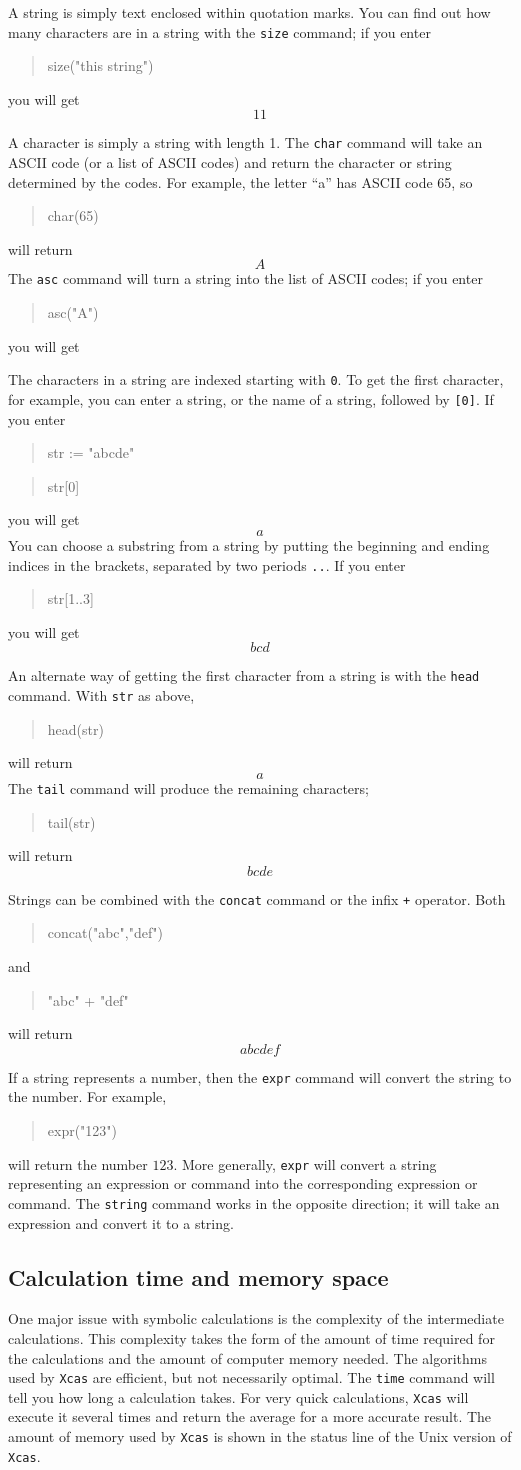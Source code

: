 \documentclass{article}
\newcommand{\xcasin}[1]
{\begin{quote}\ttfamily
#1
\end{quote}}
\newcommand{\xcasout}[1]
{\begin{equation*}
#1
\end{equation*}}
\begin{document}
A string is simply text enclosed within quotation marks.
You can find out how many characters are in a string with the
\texttt{size} command; if you enter
\xcasin{size("this string")}
you will get
\xcasout{11}

A character is simply a string with length 1.  
The \texttt{char}
command will take an ASCII code (or a list of ASCII codes) and return
the character or string determined by the codes.  For example, the
letter ``a'' has ASCII code 65, so
\xcasin{char(65)}
will return
\xcasout{A}
The \texttt{asc} command will turn a string into the list of ASCII
codes; if you enter
\xcasin{asc("A")}
you will get
\xcasout{[65]}

The characters in a string are indexed starting with \texttt{0}.
To get the first character, for example, you can enter a string, or
the name of a string, followed by \texttt{[0]}.  If you enter
\xcasin{str := "abcde"}
\xcasin{str[0]}
you will get
\xcasout{a}
You can choose a substring from a string by putting the beginning and
ending indices in the brackets, separated by two periods \texttt{..}.
If you enter
\xcasin{str[1..3]}
you will get
\xcasout{bcd}

An alternate way of getting the first character from a string is with
the \texttt{head} command.  With \texttt{str} as above, 
\xcasin{head(str)}
will return
\xcasout{a}
The \texttt{tail} command will produce the remaining characters;
\xcasin{tail(str)}
will return
\xcasout{bcde}

Strings can be combined with the \texttt{concat} command or the infix
\texttt{+} operator.  Both 
\xcasin{concat("abc","def")}
and
\xcasin{"abc" + "def"}
will return
\xcasout{abcdef}

If a string represents a number, then the \texttt{expr} command will
convert the string to the number.  For example,
\xcasin{expr("123")}
will return the number $123$.  More generally, \texttt{expr} will
convert a string representing an expression or command into the
corresponding expression or command.  The \texttt{string} command
works in the opposite direction; it will take an expression and
convert it to a string.

\subsection{Calculation time and memory space}

One major issue with symbolic calculations is the complexity of the
intermediate calculations.  This complexity takes the form of the
amount of time required for the calculations and the amount of
computer memory needed.  The algorithms used by \texttt{Xcas} are
efficient, but not necessarily optimal.  The \texttt{time} command
will tell you how long a calculation takes.  For very quick
calculations, \texttt{Xcas} will execute it several times and return
the average for a more accurate result.  The amount of memory used by
\texttt{Xcas} is shown in the status line of the Unix version of
\texttt{Xcas}.  
\end{document}
